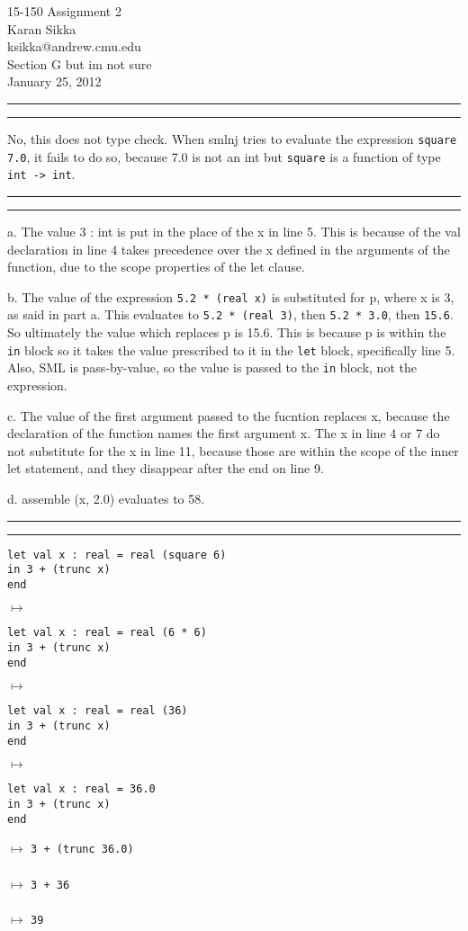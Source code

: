 \documentclass[11pt,letterpaper]{article}
\makeatletter
\newcommand{\question}[2] {\vspace{.25in} \hrule\vspace{0.5em}
\noindent{\bf #1: #2} \vspace{0.5em}
\hrule \vspace{.10in}}
\newcommand{\myname}{Karan Sikka}
\newcommand{\myandrew}{ksikka@andrew.cmu.edu}
\newcommand{\myhwnum}{2}
\makeatother
\begin{document}
\medskip

\thispagestyle{plain}
\begin{center}                  %
{\Large 15-150 Assignment \myhwnum} \\
\myname \\
\myandrew \\
Section G but im not sure\\
January 25, 2012 \\
\end{center}


\question{1}{Task 2.1}
No, this does not type check. When smlnj tries to evaluate the expression 
\verb|square 7.0|, it fails to do so, because 7.0 is not an int but 
\verb|square| is a function of type \verb|int -> int|.

\question{2}{Task 2.2}
a. The value 3 : int is put in the place of the x in line 5. This is because of
 the val declaration in line 4 takes precedence over the x defined in the 
arguments of the function, due to the scope properties of the let clause.

b. The value of the expression \verb|5.2 * (real x)| is substituted for p, where
 x is 3, as said in part a. This evaluates to \verb|5.2 * (real 3)|, then 
 \verb|5.2 * 3.0|, then \verb|15.6|. So ultimately the value which replaces p is 
15.6. This is because p is within the \verb|in| block so it takes the value 
prescribed to it in the \verb|let| block, specifically line 5. Also, SML is 
pass-by-value, so the value is passed to the \verb|in| block, not the 
expression.

c. The value of the first argument passed to the fucntion replaces x, because 
the declaration of the function names the first argument x. The x in line 4 or 
7 do not substitute for the x in line 11, because those are within the scope 
of the inner let statement, and they disappear after the end on line 9.

d. assemble (x, 2.0) evaluates to 58.

\question{3}{Task 2.3}\begin{verbatim}
let val x : real = real (square 6) 
in 3 + (trunc x) 
end
\end{verbatim}
$\mapsto$
\begin{verbatim}let val x : real = real (6 * 6)
in 3 + (trunc x)
end
\end{verbatim}
$\mapsto$ \begin{verbatim}
let val x : real = real (36)
in 3 + (trunc x)
end
\end{verbatim}
$\mapsto$ \begin{verbatim}
let val x : real = 36.0
in 3 + (trunc x)
end
\end{verbatim}
$\mapsto$ \verb|3 + (trunc 36.0)| \\\\
$\mapsto$ \verb|3 + 36| \\\\
$\mapsto$ \verb|39| \\\\
\end{document}
